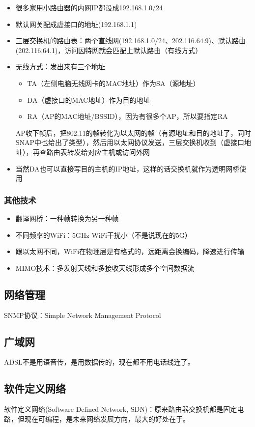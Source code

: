 \begin{itemize}
\item 很多家用小路由器的内网IP都设成192.168.1.0/24
\item 默认网关配成虚接口的地址(192.168.1.1)
\item 三层交换机的路由表：两个直线网(192.168.1.0/24、202.116.64.9)、默认路由(202.116.64.1)，访问因特网就会匹配上默认路由（有线方式）
\item 无线方式：发出来有三个地址
\begin{itemize}
    \item TA（左侧电脑无线网卡的MAC地址）作为SA（源地址）
    \item DA（虚接口的MAC地址）作为目的地址
    \item RA（AP的MAC地址/BSSID），因为有很多个AP，所以要指定RA
\end{itemize}
AP收下帧后，把802.11的帧转化为以太网的帧（有源地址和目的地址了，同时SNAP中也给出了类型），然后用以太网协议发送，三层交换机收到（虚接口地址），再查路由表转发给对应主机或访问外网
\item 当然DA也可以直接写目的主机的IP地址，这样的话交换机就作为透明网桥使用
\end{itemize}

\subsubsection{其他技术}
\begin{itemize}
\item 翻译网桥：一种帧转换为另一种帧
\item 不同频率的WiFi：5GHz WiFi干扰小（不是说现在的5G）
\item 跟以太网不同，WiFi在物理层是有格式的，远距离会换编码，降速进行传输
\item MIMO技术：多发射天线和多接收天线形成多个空间数据流
\end{itemize}

\subsection{网络管理}
SNMP协议：Simple Network Management Protocol

\subsection{广域网}
ADSL不是用语音传，是用数据传的，现在都不用电话线连了。

\subsection{软件定义网络}
软件定义网络(Software Defined Network, SDN)：原来路由器交换机都是固定电路，但现在可编程，是未来网络发展方向，最大的好处在于。

